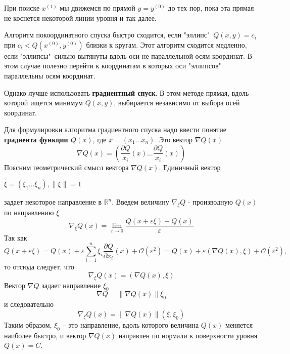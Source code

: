 При поиске $x^{(1)}$ мы движемся по прямой $y = y^{(0)}$ до тех пор, пока эта прямая не коснется некоторой линии уровня и так далее.

Алгоритм покоординатного спуска быстро сходится, если "эллипс"\, $Q(x, y) = c_i$ при $c_i < Q(x^{(0)}, y^{(0)})$ близки к кругам. Этот алгоритм сходится медленно, если "эллипсы"\, сильно вытянуты вдоль оси не параллельной осям координат. В этом случае полезно перейти к координатам в которых оси "эллипсов"\, параллельны осям координат.

Однако лучше использовать \textbf{градиентный спуск}. В этом методе прямая, вдоль которой ищется минимум $Q(x, y)$, выбирается независимо от выбора осей координат.

Для формулировки алгоритма градиентного спуска надо ввести понятие \textbf{градиента функции $Q(x)$}, где $x = (x_1 \dots x_n)$. Это вектор $\nabla Q(x)$
\begin{equation} \label{eq:8.1}
	\nabla Q(x) = (\frac{\partial Q}{x_i}(x) \dots \frac{\partial Q}{x_i}(x))
\end{equation}
Поясним геометрический смысл вектора $\nabla Q(x)$. Единичный вектор \parbox{39mm}{$\xi = (\xi_1 \dots \xi_n), \|\xi\| = 1$} задает некоторое направление в $\mathbb{R}^n$. Введем величину $\nabla_\xi Q$ - производную $Q(x)$ по направлению $\xi$
\begin{equation} \label{eq:8.2}
	\nabla_\xi Q(x) = \lim_{\varepsilon \to 0} \frac{Q(x+\varepsilon\xi) - Q(x)}{\varepsilon}
\end{equation}
Так как
\begin{equation} \label{eq:8.3}
	Q(x+\varepsilon\xi) = Q(x) + \varepsilon\sum^n_{i=1}{\xi_i \frac{\partial Q}{\partial x_i}(x) + \mathcal{O}(\varepsilon^2)} = Q(x) + \varepsilon(\nabla Q(x), \xi) + \mathcal{O}(\varepsilon^2),
\end{equation}
то отсюда следует, что
\begin{equation} \label{eq:8.4}
	\nabla_\xi Q(x) = (\nabla Q(x), \xi) 
\end{equation}
Вектор $\nabla Q$ задает направление $\xi_0$
\begin{equation} \label{eq:8.5}
	\nabla Q = \|\nabla Q(x)\|\xi_0 
\end{equation}
и следовательно
\begin{equation} \label{eq:8.6}
	\nabla_\xi Q(x) = \|\nabla Q(x)\|(\xi, \xi_0) 
\end{equation}
Таким образом, $\xi_0$ -- это направление, вдоль которого величина $Q(x)$ меняется наиболее быстро, и вектор $\nabla Q(x)$ направлен по нормали к поверхности уровня $Q(x) = C$.

